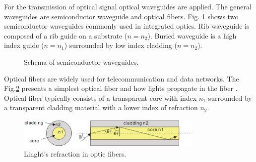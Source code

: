 For the transmission of optical signal optical waveguides are applied. The general waveguides are semiconductor waveguide and optical fibers. 
Fig. \ref{fig:semi_waveguides} shows two semiconductor waveguides commonly used in integrated optics. Rib waveguide is composed of a rib guide on a substrate ($n=n_{2}$). Buried waveguide is a high index guide ($n=n_{1}$) surrounded by low index cladding ($n=n_{2}$).\\

\begin{figure}[!ht]
\centering
{}
\hfill
{}
\caption{Schema of semiconductor waveguides.}
\label{fig:semi_waveguides}
\end{figure}
Optical fibers are widely used for telecommunication and data networks. The Fig.\ref{fig:opticfiber} presents a simplest optical fiber and how lights propagate in the fiber . Optical fiber typically consists of a transparent core with index $n_{1}$ surrounded by a transparent cladding material with a lower index of refraction $n_{2}$.\\
 
\begin{figure}[httbp]
\centering
\includegraphics[width=0.8\textwidth]{bilder/opticfiber}
\caption{Linght's refraction in optic fibers.}
\label{fig:opticfiber}
\end{figure}

